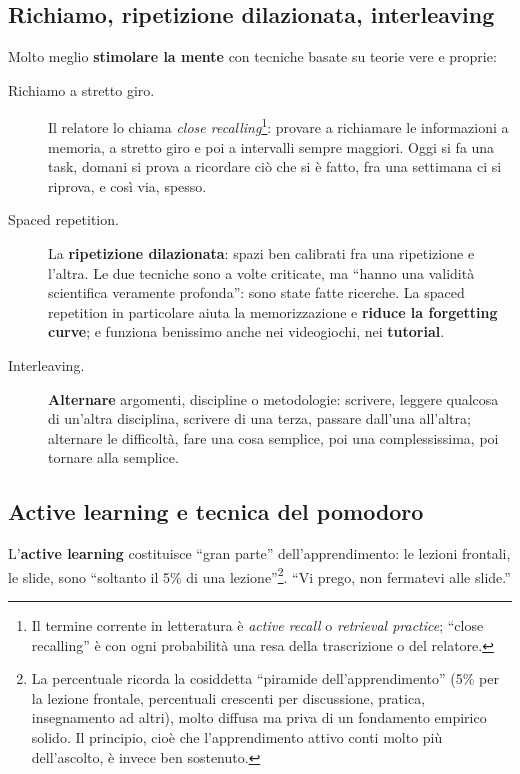 \subsection{Richiamo, ripetizione dilazionata, interleaving}

Molto meglio \textbf{stimolare la mente} con tecniche basate su teorie vere
e proprie:
\begin{description}
  \item[Richiamo a stretto giro.] Il relatore lo chiama \emph{close
        recalling}\footnote{Il termine corrente in letteratura è
        \emph{active recall} o \emph{retrieval practice}; ``close
        recalling'' è con ogni probabilità una resa della trascrizione o
        del relatore.}: provare a richiamare le informazioni a memoria, a
        stretto giro e poi a intervalli sempre maggiori. Oggi si fa una
        task, domani si prova a ricordare ciò che si è fatto, fra una
        settimana ci si riprova, e così via, spesso.
  \item[Spaced repetition.] La \textbf{ripetizione dilazionata}: spazi ben
        calibrati fra una ripetizione e l'altra. Le due tecniche sono a
        volte criticate, ma ``hanno una validità scientifica veramente
        profonda'': sono state fatte ricerche. La spaced repetition in
        particolare aiuta la memorizzazione e \textbf{riduce la forgetting
        curve}; e funziona benissimo anche nei videogiochi, nei
        \textbf{tutorial}.
  \item[Interleaving.] \textbf{Alternare} argomenti, discipline o
        metodologie: scrivere, leggere qualcosa di un'altra disciplina,
        scrivere di una terza, passare dall'una all'altra; alternare le
        difficoltà, fare una cosa semplice, poi una complessissima, poi
        tornare alla semplice.
\end{description}

\subsection{Active learning e tecnica del pomodoro}

L'\textbf{active learning} costituisce ``gran parte'' dell'apprendimento: le
lezioni frontali, le slide, sono ``soltanto il 5\% di una
lezione''\footnote{La percentuale ricorda la cosiddetta ``piramide
dell'apprendimento'' (5\% per la lezione frontale, percentuali crescenti
per discussione, pratica, insegnamento ad altri), molto diffusa ma priva di
un fondamento empirico solido. Il principio, cioè che l'apprendimento
attivo conti molto più dell'ascolto, è invece ben sostenuto.}. ``Vi prego,
non fermatevi alle slide.''


